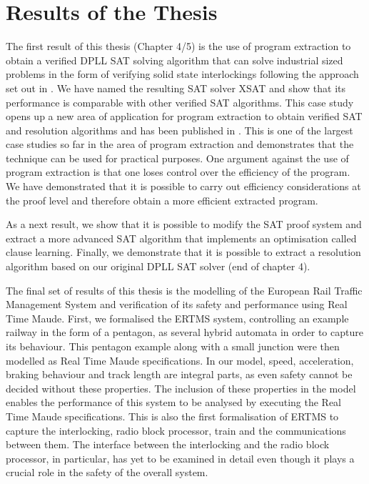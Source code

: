 \section{Results of the Thesis}
 

The first result of this thesis (Chapter 4/5) is the use of program extraction to obtain a verified DPLL SAT solving algorithm that can solve industrial sized problems in the form of verifying solid state interlockings following the approach set out in \cite{AL14a}. We have named the resulting SAT solver XSAT and show that its performance is comparable with other verified SAT algorithms. This case study opens up a new area of application for program extraction to obtain verified SAT and resolution algorithms and has been published in \cite{AL12,AL14b}. This is one of the largest case studies so far in the area of program extraction and demonstrates that the technique can be used for practical purposes.  One argument against the use of program extraction is that one loses control over the efficiency of the program. We have demonstrated that it is possible to carry out efficiency considerations at the proof level and therefore obtain a more efficient extracted program. 

As a next result, we show that it is possible to modify the SAT proof system and extract a more advanced SAT algorithm that implements an optimisation called clause learning. Finally, we demonstrate that it is possible to extract a resolution algorithm based on our original DPLL SAT solver (end of chapter 4).


The final set of  results of this thesis is the modelling of the European Rail Traffic Management System and verification of its safety and performance using Real Time Maude. First, we formalised the ERTMS system, controlling an example railway in the form of a pentagon, as several hybrid automata in order to capture its behaviour.  This pentagon example along with a small junction were then modelled as Real Time Maude specifications. In our model, speed, acceleration, braking behaviour and track length are integral parts, as even safety cannot be decided without these properties. The inclusion of these properties in the model enables the performance of this system to be analysed by executing the Real Time Maude specifications. This is also the first formalisation of ERTMS to capture the interlocking, radio block processor, train and the communications between them. The interface between the interlocking and the radio block processor, in particular, has yet to be examined in detail even though it plays a crucial role in the safety of the overall system.

